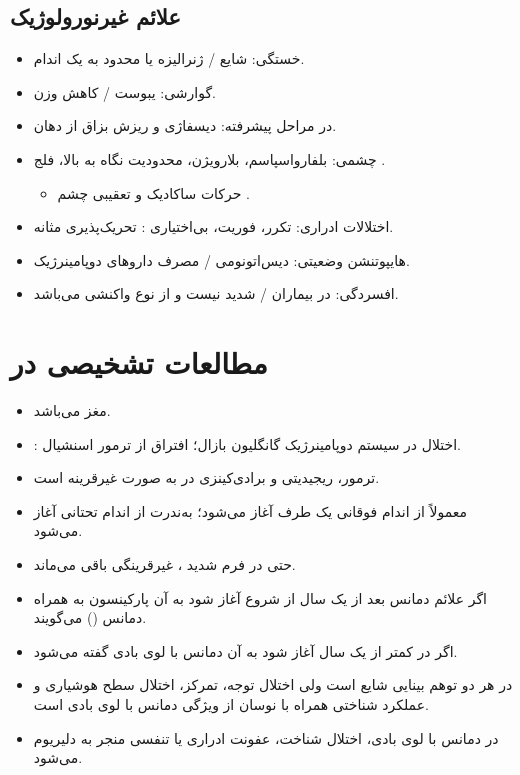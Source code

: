 \documentclass[a4paper,12pt]{extbook}
\begin{document}
\subsection*{علائم غیرنورولوژیک}
\begin{itemize}
\item خستگی: شایع / ژنرالیزه یا محدود به یک اندام.
\item گوارشی: یبوست / کاهش وزن.
\item در مراحل پیشرفته: دیسفاژی و ریزش بزاق از دهان.
\item چشمی: بلفارواسپاسم، بلارویژن، محدودیت نگاه به بالا، فلج .
\begin{itemize}
\item حرکات ساکادیک و تعقیبی چشم .
\end{itemize}
\end{itemize}

\begin{itemize}
\item اختلالات ادراری: تکرر، فوریت، بی‌اختیاری : تحریک‌پذیری مثانه.
\item هایپوتنشن وضعیتی: دیس‌اتونومی / مصرف داروهای دوپامینرژیک.
\item افسردگی: در  بیماران / شدید نیست و از نوع واکنشی می‌باشد.
\end{itemize}
\section*{مطالعات تشخیصی در }
\begin{itemize}
\item {} مغز  می‌باشد.
\item {}: اختلال در سیستم دوپامینرژیک گانگلیون بازال؛ افتراق  از ترمور اسنشیال.
\item ترمور، ریجیدیتی و برادی‌کینزی در  به صورت غیرقرینه است.
\item {} معمولاً از اندام فوقانی یک طرف آغاز می‌شود؛ به‌ندرت از اندام تحتانی آغاز می‌شود.
\item حتی در فرم شدید ، غیرقرینگی باقی می‌ماند.
\item اگر علائم دمانس بعد از یک سال از شروع  آغاز شود به آن پارکینسون به همراه دمانس () می‌گویند.
\item اگر در کمتر از یک سال آغاز شود به آن دمانس با لوی بادی گفته می‌شود.
\item در هر دو توهم بینایی شایع است ولی اختلال توجه، تمرکز، اختلال سطح هوشیاری و عملکرد شناختی همراه با نوسان از ویژگی دمانس با لوی بادی است.
\item در دمانس با لوی بادی، اختلال شناخت، عفونت ادراری یا تنفسی منجر به دلیریوم می‌شود.
\end{itemize}
\end{document}
